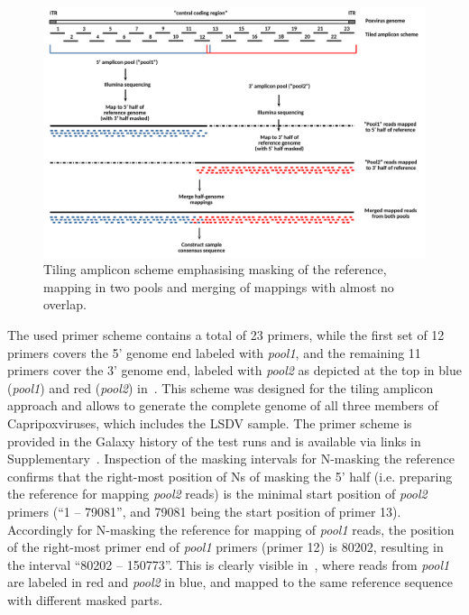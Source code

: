 \begin{figure}[ht!]
    \centering
    \hspace*{-8pt}
    \includegraphics[width=1.1\textwidth]{media/4-pox-ampl-fig.png}
    \caption[Tiling amplicon scheme used in poxvirus workflow.]{Tiling amplicon scheme emphasising masking of the reference, mapping in two pools and merging of mappings with almost no overlap.}
    \label{fig:4-pox-ampl}
\end{figure}
The used primer scheme contains a total of 23 primers, while the first set of 12 primers covers the 5' genome end labeled with \textit{pool1}, and the remaining 11 primers cover the 3' genome end, labeled with \textit{pool2} as depicted at the top in blue (\textit{pool1}) and red (\textit{pool2}) in~. This scheme was designed for the tiling amplicon approach and allows to generate the complete genome of all three members of Capripoxviruses, which includes the \ac{LSDV} sample. %
The primer scheme is provided in the Galaxy history of the test runs and is available via links in Supplementary~. Inspection  of the masking intervals for N-masking the reference confirms that the right-most position of Ns of masking the 5' half (i.e. preparing the reference for mapping \textit{pool2} reads) is the minimal start position of \textit{pool2} primers (``1 -- 79081'', and 79081 being the start position of primer 13). Accordingly for N-masking the reference for mapping of \textit{pool1} reads, the position of the right-most primer end of \textit{pool1} primers (primer 12) is 80202, resulting in the interval ``80202 -- 150773''. This is clearly visible in~, where reads from \textit{pool1} are labeled in red and \textit{pool2} in blue, and mapped to the same reference sequence with different masked parts. \\ %

